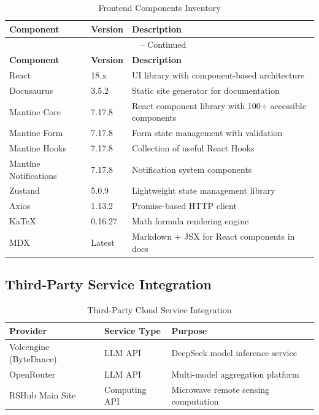 \begin{longtable}{@{}p{3.5cm}p{2.5cm}p{7.5cm}@{}}
	\caption{Frontend Components Inventory} \\
	\toprule
	\textbf{Component} & \textbf{Version} & \textbf{Description} \\
	\midrule
	\endfirsthead
	\multicolumn{3}{c}{\tablename\ \thetable{} -- Continued} \\
	\toprule
	\textbf{Component} & \textbf{Version} & \textbf{Description} \\
	\midrule
	\endhead
	\bottomrule
	\endfoot
	React & 18.x & UI library with component-based architecture \\
	Docusaurus & 3.5.2 & Static site generator for documentation \\
	Mantine Core & 7.17.8 & React component library with 100+ accessible components \\
	Mantine Form & 7.17.8 & Form state management with validation \\
	Mantine Hooks & 7.17.8 & Collection of useful React Hooks \\
	Mantine Notifications & 7.17.8 & Notification system components \\
	Zustand & 5.0.9 & Lightweight state management library \\
	Axios & 1.13.2 & Promise-based HTTP client \\
	KaTeX & 0.16.27 & Math formula rendering engine \\
	MDX & Latest & Markdown + JSX for React components in docs \\
\end{longtable}

\subsection{Third-Party Service Integration}

\begin{table}[H]
	\centering
	\caption{Third-Party Cloud Service Integration}
	\begin{tabular}{@{}lll@{}}
		\toprule
		\textbf{Provider} & \textbf{Service Type} & \textbf{Purpose} \\
		\midrule
		Volcengine (ByteDance) & LLM API & DeepSeek model inference service \\
		OpenRouter & LLM API & Multi-model aggregation platform \\
		RSHub Main Site & Computing API & Microwave remote sensing computation \\
		\bottomrule
	\end{tabular}
\end{table}


